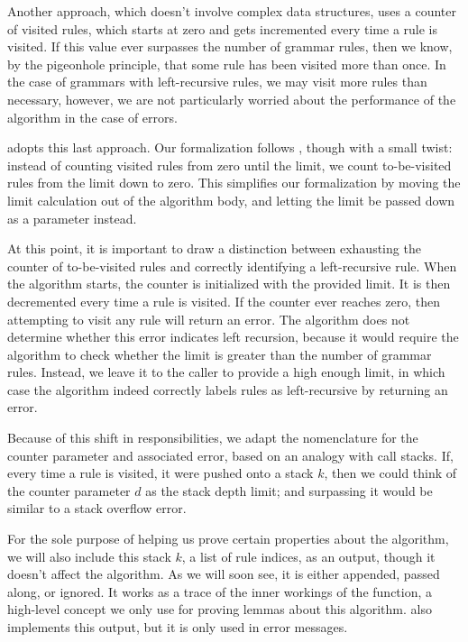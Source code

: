 Another approach,
which doesn't involve complex data structures,
uses a counter of visited rules,
which starts at zero
and gets incremented every time a rule is visited.
If this value ever surpasses the number of grammar rules,
then we know, by the pigeonhole principle,
that some rule has been visited more than once.
In the case of grammars with left-recursive rules,
we may visit more rules than necessary,
however, we are not particularly worried
about the performance of the algorithm
in the case of errors.

\lpeg{} adopts this last approach.
Our formalization follows \lpeg{},
though with a small twist:
instead of counting visited rules from zero until the limit,
we count to-be-visited rules from the limit down to zero.
This simplifies our formalization
by moving the limit calculation out of the algorithm body,
and letting the limit be passed down as a parameter instead.

At this point,
it is important to draw a distinction between
exhausting the counter of to-be-visited rules
and correctly identifying a left-recursive rule.
When the algorithm starts,
the counter is initialized with the provided limit.
It is then decremented every time a rule is visited.
If the counter ever reaches zero,
then attempting to visit any rule
will return an error.
The algorithm does not determine
whether this error indicates left recursion,
because it would require the algorithm to check
whether the limit is greater than the number of grammar rules.
Instead, we leave it to the caller
to provide a high enough limit,
in which case the algorithm indeed
correctly labels rules as left-recursive
by returning an error.

Because of this shift in responsibilities,
we adapt the nomenclature
for the counter parameter and associated error,
based on an analogy with call stacks.
If, every time a rule is visited, it were pushed onto a stack $k$,
then we could think of the counter parameter $d$ as the stack depth limit;
and surpassing it would be similar to a stack overflow error.

For the sole purpose of helping us prove certain properties about the algorithm,
we will also include this stack $k$, a list of rule indices, as an output,
though it doesn't affect the algorithm.
As we will soon see, it is either appended, passed along, or ignored.
It works as a trace of the inner workings of the function,
a high-level concept we only use for proving lemmas about this algorithm.
\lpeg{} also implements this output, but it is only used in error messages.

